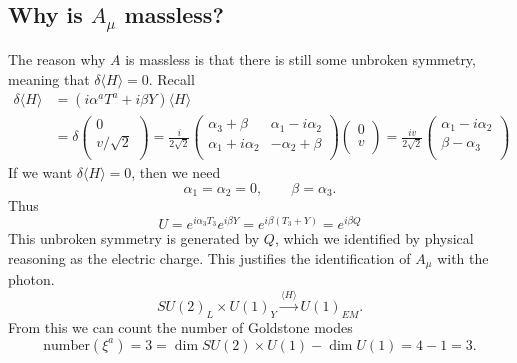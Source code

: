 \subsection*{Why is $A_{\mu}$ massless?}%

The reason why $A$ is massless is that there is still some unbroken symmetry, meaning that $\delta \langle H \rangle = 0$.
Recall
\begin{align}
  \delta \langle H \rangle &= (i \alpha^{a} T^{a} + i \beta Y) \langle H \rangle \\
   &= \delta 
  \begin{pmatrix}
  0 \\
  v / \sqrt{2} \\
  \end{pmatrix}
  = \frac{i}{2 \sqrt{2}} 
  \begin{pmatrix}
   \alpha_3 + \beta & \alpha_1 - i \alpha_2 \\
   \alpha_1 + i \alpha_2 & -\alpha_2 + \beta \\
  \end{pmatrix}
  \begin{pmatrix}
  0 \\
  v \\
  \end{pmatrix}
  = \frac{iv}{2 \sqrt{2}}
  \begin{pmatrix}
  \alpha_1 - i \alpha_2 \\
  \beta - \alpha_3 \\
  \end{pmatrix}
\end{align}
If we want $\delta \langle H \rangle = 0$, then we need
\begin{equation}
  \alpha_1 = \alpha_2 = 0, \qquad \beta = \alpha_3.
\end{equation}
Thus
\begin{equation}
  U = e^{i \alpha_3 T_3} e^{i \beta Y} = e^{i \beta (T_3 + Y)} = e^{i \beta Q}
\end{equation}
This unbroken symmetry is generated by $Q$, which we identified by physical reasoning as the electric charge.
This justifies the identification of $A_{\mu}$ with the photon.
\begin{equation}
  SU(2)_L \times U(1)_Y \xrightarrow{\langle H \rangle} U(1)_{EM}.
\end{equation}
From this we can count the number of Goldstone modes
\begin{equation}
  \text{number}(\xi^{a}) = 3 = \dim SU(2) \times U(1) - \dim U(1) = 4 - 1  = 3.
\end{equation}

